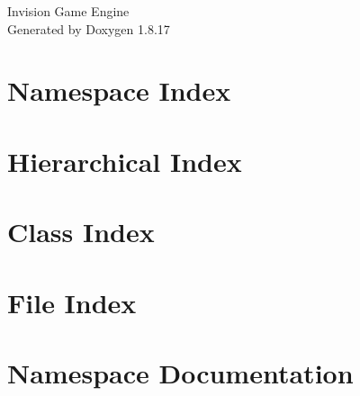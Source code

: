 \let\mypdfximage\pdfximage\def\pdfximage{\immediate\mypdfximage}\documentclass[twoside]{book}
\newcommand{\+}{\discretionary{\mbox{\scriptsize$\hookleftarrow$}}{}{}}
\newcommand{\clearemptydoublepage}{%
  \newpage{\pagestyle{empty}\cleardoublepage}%
}
\begin{document}
\hypersetup{pageanchor=false,
             bookmarksnumbered=true,
             pdfencoding=unicode
            }
\begin{titlepage}
\vspace*{7cm}
\begin{center}%
{\Large Invision Game Engine }\\
\vspace*{1cm}
{\large Generated by Doxygen 1.8.17}\\
\end{center}
\end{titlepage}
\clearemptydoublepage
{}
\tableofcontents
\clearemptydoublepage
{}
\hypersetup{pageanchor=true}

\chapter{Namespace Index}

\chapter{Hierarchical Index}

\chapter{Class Index}

\chapter{File Index}

\chapter{Namespace Documentation}

\end{document}

